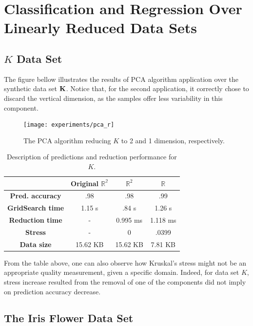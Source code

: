 \section{Classification and Regression Over Linearly Reduced Data Sets}
\label{sec:experiments_linear_ds}

\subsection{$K$ Data Set}

The figure bellow illustrates the results of PCA algorithm application over the synthetic data set $\mathbf{K}$. Notice that, for the second application, it correctly chose to discard the vertical dimension, as the samples offer less variability in this component.

\begin{figure}[H]
	\centering
	\captionsetup{justification=centering}
	
	\texttt{[image: experiments/pca\_r]}
	\caption{The PCA algorithm reducing $K$ to 2 and 1 dimension, respectively.}
	\label{fig:datasetrpca}
\end{figure}

\begin{table}[H]
	\centering
	\begin{tabular}{|c|c|c|c|}
		\hline
		& \textbf{Original $\mathbb{R^2}$} & \textbf{$\mathbb{R}^2$} & \textbf{$\mathbb{R}$} \\\hline
		\textbf{Pred. accuracy} & .98 & .98 & .99 \\\hline
		\textbf{GridSearch time} & 1.15 s & .84 s & 1.26 s \\\hline
		\textbf{Reduction time} & - & 0.995 ms & 1.118 ms \\\hline
		\textbf{Stress} & - & 0 & .0399 \\\hline
		\textbf{Data size} & 15.62 KB & 15.62 KB & 7.81 KB \\\hline
	\end{tabular}
	\caption{Description of predictions and reduction performance for $K$.}
\end{table}

From the table above, one can also observe how Kruskal's stress might not be an appropriate quality measurement, given a specific domain. Indeed, for data set $K$, stress increase resulted from the removal of one of the components did not imply on prediction accuracy decrease.

\clearpage
\subsection{The Iris Flower Data Set}

